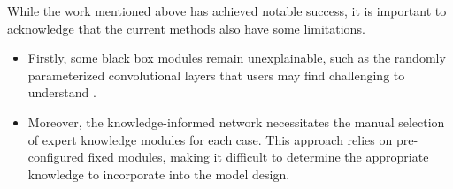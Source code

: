 \documentclass[lettersize,journal]{IEEEtran}
\begin{document}



While the work mentioned above has achieved notable success, it is important to acknowledge that the current methods also have some limitations.
\begin{itemize}
    \item Firstly, some black box modules remain unexplainable, such as the randomly parameterized convolutional layers that users may find challenging to understand \cite{Li2024_TON}.
    \item Moreover, the knowledge-informed network necessitates the manual selection of expert knowledge modules for each case. This approach relies on pre-configured fixed modules, making it difficult to determine the appropriate knowledge to incorporate into the model design.
\end{itemize}
\end{document}
